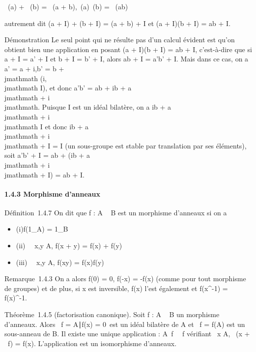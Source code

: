 \documentclass[]{article}
\begin{document}
\pi~(a) + \pi~(b) = \pi~(a + b),\quad \pi~(a)\pi~(b) = \pi~(ab)

autrement dit (a + I) + (b + I) = (a + b) + I et (a + I)(b + I) = ab +
I.

Démonstration Le seul point qui ne résulte pas d'un calcul évident est
qu'on obtient bien une application en posant (a + I)(b + I) = ab + I,
c'est-à-dire que si a + I = a' + I et b + I = b' + I, alors ab + I =
a'b' + I. Mais dans ce cas, on a a' = a + i,b' = b + \\jmathmath (i,\\jmathmath \in I), et
donc a'b' = ab + ib + a\\jmathmath + i\\jmathmath. Puisque I est un idéal bilatère, on a ib
+ a\\jmathmath + i\\jmathmath \in I et donc ib + a\\jmathmath + i\\jmathmath + I = I (un sous-groupe est stable
par translation par ses éléments), soit a'b' + I = ab + (ib + a\\jmathmath + i\\jmathmath +
I) = ab + I.

\paragraph{1.4.3 Morphisme d'anneaux}

Définition~1.4.7 On dit que f : A \rightarrow~ B est un morphisme d'anneaux si on a

\begin{itemize}
\itemsep1pt\parskip0pt
\item
  (i)f(1_A) = 1_B
\item
  (ii) \forall~~x,y \in A, f(x + y) = f(x) + f(y)
\item
  (iii) \forall~~x,y \in A, f(xy) = f(x)f(y)
\end{itemize}

Remarque~1.4.3 On a alors f(0) = 0, f(-x) = -f(x) (comme pour tout
morphisme de groupes) et de plus, si x est inversible, f(x) l'est
également et f(x^-1) = f(x)^-1.

Théorème~1.4.5 (factorisation canonique). Soit f : A \rightarrow~ B un morphisme
d'anneaux. Alors
\mathrmKer~f =
\x \in A∣f(x) =
0\ est un idéal bilatère de A et
\mathrmIm~f = f(A) est un
sous-anneau de B. Il existe une unique application
\overlinef :
A\diagup\mathrmKer~f
\rightarrow~\mathrmIm~f vérifiant
\forall~x \in A, \overlinef~(x
+ \mathrmKer~f) = f(x).
L'application \overlinef est un isomorphisme
d'anneaux.
\end{document}
